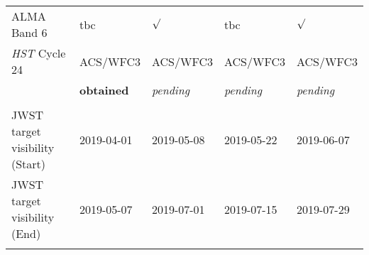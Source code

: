 \begin{table}
\begin{center}
\begin{tabular}{||  l|l|l|l|l ||}
  ALMA  Band 6                  & tbc                        & $\surd$                & tbc                     & $\surd$  \\
  {\it HST} Cycle 24           & {\footnotesize ACS/WFC3} &{\footnotesize ACS/WFC3}    & {\footnotesize ACS/WFC3}    & {\footnotesize ACS/WFC3} \\
                                       & {\footnotesize {\bf obtained}}  & {\footnotesize {\it pending}}   & {\footnotesize {\it pending}}  & {\footnotesize {\it pending}} \\
 &&&& \\
JWST target visibility (Start) & 2019-04-01    & 2019-05-08    & 2019-05-22   & 2019-06-07  \\ 
JWST target visibility (End)  & 2019-05-07    & 2019-07-01     & 2019-07-15   & 2019-07-29   \\ 
 &&&& \\
\hline\hline
      \end{tabular}
\caption{}
\label{tab:targets} 
  \end{center}
\end{table}




